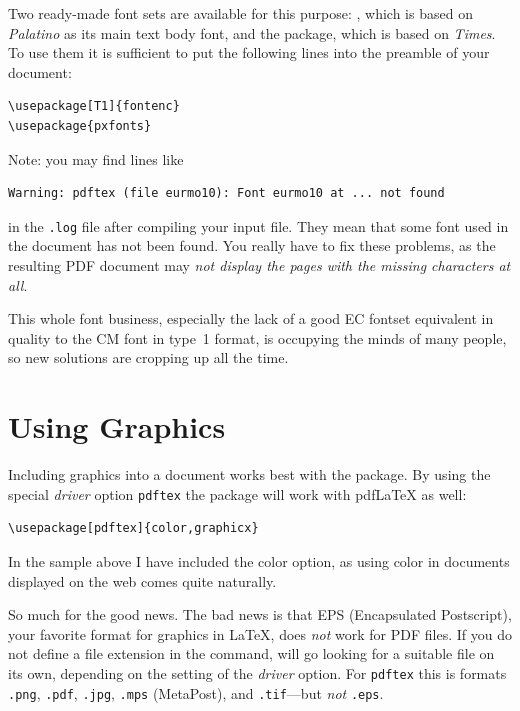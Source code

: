 \documentclass[twoside,11pt,letterpaper]{article}
\begin{document}
Two ready-made font sets are available for this purpose:
, which is based on \emph{Palatino} as its main text body font,
and the  package, which is based on \emph{Times}. To use them it is
sufficient to put the following lines into the preamble of your
document:
\begin{code}
\begin{verbatim}
\usepackage[T1]{fontenc}
\usepackage{pxfonts}
\end{verbatim}
\end{code}

Note: you may find lines like
\begin{verbatim}
Warning: pdftex (file eurmo10): Font eurmo10 at ... not found
\end{verbatim}
in the  \texttt{.log} file after compiling your input file. They mean
that some font used in the document has not been found. You really have
to fix these problems, as the resulting PDF document may 
\emph{not display the pages with the missing characters at all}.

This whole font business, especially the lack of a good EC fontset 
equivalent in quality to the CM font in type~1 format,  is occupying the 
minds of many people, so new solutions are cropping up all the time.
\section{Using Graphics}
\label{ssec:pdfgraph}

Including graphics into a document works best with the 
 package.%
By using the special \emph{driver} option \texttt{pdftex} the
package will work with pdf\LaTeX{} as well:
\begin{code}
\begin{verbatim}
\usepackage[pdftex]{color,graphicx}
\end{verbatim}
\end{code}
In the sample above I have included the color option, as using color in
documents displayed on the web comes quite naturally.

So much for the good news. The bad news is that EPS (Encapsulated Postscript), your favorite format
for graphics in \LaTeX{}, does
\emph{not} work for PDF files. If you do not define a file extension
in the  command,  will go
looking for a suitable file on its own, depending on the setting of
the \emph{driver} option. For \texttt{pdftex} this is
formats \texttt{.png}, \texttt{.pdf}, \texttt{.jpg}, \texttt{.mps} (MetaPost),
and \texttt{.tif}---but \emph{not} \texttt{.eps}.
\end{document}
